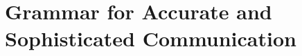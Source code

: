 \documentclass[
    12pt,
    a4paper,
    oneside,
    openany
]{book}
\begin{document}




\part{Grammar for Accurate and Sophisticated Communication}

\end{document}
